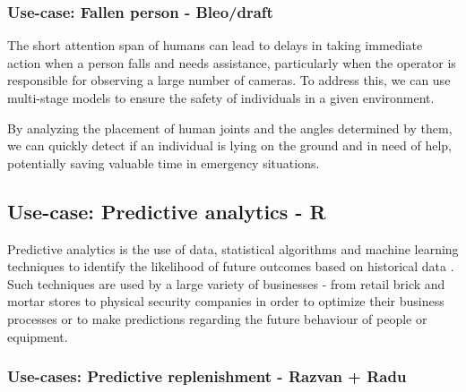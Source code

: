 \documentclass{article}
\begin{document}
    \subsubsection{Use-case: Fallen person - Bleo/draft}

    The short attention span of humans can lead to delays in taking immediate action when a person falls and needs assistance, particularly when the operator is responsible for observing a large number of cameras. To address this, we can use multi-stage models to ensure the safety of individuals in a given environment.
    
    By analyzing the placement of human joints and the angles determined by them, we can quickly detect if an individual is lying on the ground and in need of help, potentially saving valuable time in emergency situations.


\subsection{Use-case: Predictive analytics - R}
Predictive analytics is the use of data, statistical algorithms and machine learning techniques to identify the likelihood of future outcomes based on historical data \cite{klimberg2016fundamentals}. Such techniques are used by a large variety of businesses - from retail brick and mortar stores to physical security companies in order to optimize their business processes or to make predictions regarding the future behaviour of people or equipment.

\subsubsection{Use-cases: Predictive replenishment - Razvan + Radu}
\end{document}
